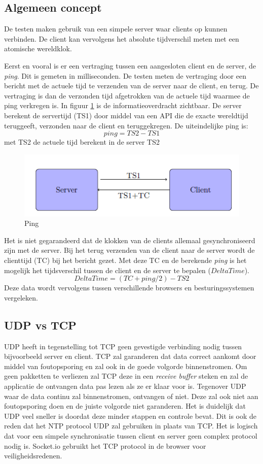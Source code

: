 \subsection{Algemeen concept}
De testen maken gebruik van een simpele server waar clients op kunnen verbinden. De client kan vervolgens het absolute tijdverschil meten met een atomische wereldklok.

Eerst en vooral is er een vertraging tussen een aangesloten client en de server, de {\it ping}. Dit is gemeten in milliseconden. De testen meten de vertraging door een bericht met de actuele tijd te verzenden van de server naar de client, en terug. De vertraging is dan de verzonden tijd afgetrokken van de actuele tijd waarmee de ping verkregen is.
In figuur \ref{ping} is de informatieoverdracht zichtbaar. De server berekent de servertijd (TS1) door middel van een API die de exacte wereldtijd teruggeeft, verzonden naar de client en teruggekregen. De uiteindelijke ping is: \[ping = TS2 - TS1\] met TS2 de actuele tijd berekent in de server TS2

\begin{figure}[h]
\centering
\includegraphics[scale=0.8]{img/img.png}
\caption{Ping} \label{ping}
\end{figure}


Het is niet gegarandeerd dat de klokken van de clients allemaal gesynchroniseerd zijn met de server. Bij het terug verzenden van de client naar de server wordt de clienttijd (TC) bij het bericht gezet.  Met deze TC en de berekende {\it ping} is het mogelijk het tijdsverschil tussen de client en de server te bepalen ($DeltaTime$).
\[DeltaTime = (TC+ping/2) - TS2\]
Deze data wordt vervolgens tussen verschillende browsers en besturingssystemen vergeleken.

\subsection{UDP vs TCP}

UDP heeft in tegenstelling tot TCP geen gevestigde verbinding nodig tussen bijvoorbeeld server en client. TCP zal garanderen dat data correct aankomt door middel van foutopsporing en zal ook in de goede volgorde binnenstromen. Om geen pakketten te verliezen zal TCP deze in een {\it receive buffer} steken en zal de applicatie de ontvangen data pas lezen als ze er klaar voor is. Tegenover UDP waar de data continu zal binnenstromen, ontvangen of niet. Deze zal ook niet aan foutopsporing doen en de juiste volgorde niet garanderen. Het is duidelijk dat UDP veel sneller is doordat deze minder stappen en controle bevat. Dit is ook de reden dat het NTP protocol UDP zal gebruiken in plaats van TCP. Het is logisch dat voor een simpele synchronisatie tussen client en server geen complex protocol nodig is. Socket.io gebruikt het TCP protocol in de browser voor veiligheidsredenen.

